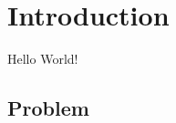 \documentclass{article}
\begin{document}
\section{Introduction}
	Hello World! \cite{gomez2014improving}
\subsection{Problem}












\end{document}

